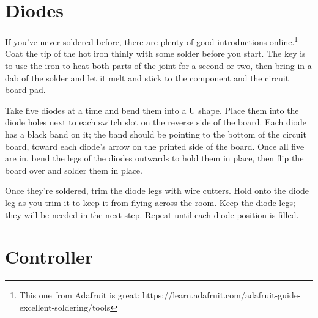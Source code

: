 \documentclass{article}
\begin{document}
\section{Diodes}

If you've never soldered before, there are plenty of good
introductions online.\footnote{This one from Adafruit is great:
  https://learn.adafruit.com/adafruit-guide-excellent-soldering/tools}
Coat the tip of the hot iron thinly with some solder before you
start. The key is to use the iron to heat both parts of the joint for
a second or two, then bring in a dab of the solder and let it melt and
stick to the component and the circuit board pad.

\vspace{1em}

Take five diodes at a time and bend them into a U shape. Place them
into the diode holes next to each switch slot on the reverse side of
the board. Each diode has a black band on it; the band should be
pointing to the bottom of the circuit board, toward each diode's arrow
on the printed side of the board. Once all five are in, bend the legs
of the diodes outwards to hold them in place, then flip the board over
and solder them in place.

\vspace{1em}
\noindent{}
\vspace{1em}

Once they're soldered, trim the diode legs with wire cutters. Hold
onto the diode leg as you trim it to keep it from flying across
the room. Keep the diode legs; they will be needed in the next
step. Repeat until each diode position is filled.

\section{Controller}
\end{document}
